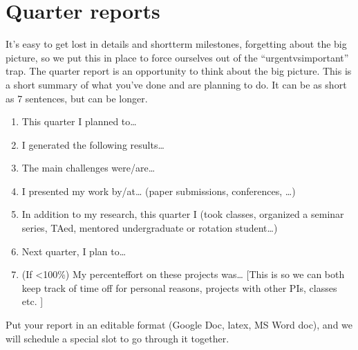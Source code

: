 \documentclass[letterpaper,10pt,english]{sphinxmanual}
\begin{document}
\section{Quarter reports}
\label{\detokenize{04WhatIsAPhD:quarter-reports}}
\sphinxAtStartPar
It’s easy to get lost in details and short\sphinxhyphen{}term milestones, forgetting about the big picture, so we put this in place to force ourselves out of the “urgent\sphinxhyphen{}vs\sphinxhyphen{}important” trap.
The quarter report is an opportunity to think about the big picture.
This is a short summary of what you’ve done and are planning to do.
It can be as short as 7 sentences, but can be longer.
\begin{enumerate}
%
\item {} 
\sphinxAtStartPar
This quarter I planned to…

\item {} 
\sphinxAtStartPar
I generated the following results…

\item {} 
\sphinxAtStartPar
The main challenges were/are…

\item {} 
\sphinxAtStartPar
I presented my work by/at… (paper submissions, conferences, …)

\item {} 
\sphinxAtStartPar
In addition to my research, this quarter I (took classes, organized a seminar series, TAed, mentored undergraduate or rotation student…)

\item {} 
\sphinxAtStartPar
Next quarter, I plan to…

\item {} 
\sphinxAtStartPar
(If \textless{}100\%) My percent\sphinxhyphen{}effort on these projects was… {[}This is so we can both keep track of time off for personal reasons, projects with other PIs, classes etc. {]}

\end{enumerate}

\sphinxAtStartPar
Put your report in an editable format (Google Doc, latex, MS Word doc), and we will schedule a special slot to go through it together.
\end{document}
